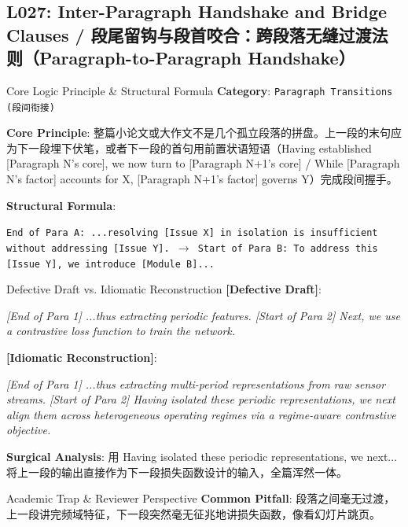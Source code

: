 \subsection{L027: Inter-Paragraph Handshake and Bridge Clauses / 段尾留钩与段首咬合：跨段落无缝过渡法则（Paragraph-to-Paragraph Handshake）}\label{sec:logic:L027}
\begin{ConceptBox}{Core Logic Principle \& Structural Formula}
\textbf{Category}: \texttt{Paragraph Transitions (段间衔接)}\par\vspace{3pt}
\textbf{Core Principle}: 整篇小论文或大作文不是几个孤立段落的拼盘。上一段的末句应为下一段埋下伏笔，或者下一段的首句用前置状语短语（Having established [Paragraph N's core], we now turn to [Paragraph N+1's core] / While [Paragraph N's factor] accounts for X, [Paragraph N+1's factor] governs Y）完成段间握手。\par\vspace{4pt}
\textbf{Structural Formula}:\par\noindent\texttt{End of Para A: ...resolving [Issue X] in isolation is insufficient without addressing [Issue Y]. $\to$ Start of Para B: To address this [Issue Y], we introduce [Module B]...}
\end{ConceptBox}
\begin{ExampleBox}{Defective Draft vs. Idiomatic Reconstruction}
\textbf{\color{TargetHighlight}[Defective Draft]}:\par\textit{[End of Para 1] ...thus extracting periodic features. [Start of Para 2] Next, we use a contrastive loss function to train the network.}\par\vspace{4pt}
\textbf{\color{AcadNavy}[Idiomatic Reconstruction]}:\par\textit{[End of Para 1] ...thus extracting multi-period representations from raw sensor streams. [Start of Para 2] Having isolated these periodic representations, we next align them across heterogeneous operating regimes via a regime-aware contrastive objective.}\par\vspace{4pt}
\textbf{Surgical Analysis}: 用 Having isolated these periodic representations, we next... 将上一段的输出直接作为下一段损失函数设计的输入，全篇浑然一体。
\end{ExampleBox}
\begin{TipBox}{Academic Trap \& Reviewer Perspective}
\textbf{Common Pitfall}: 段落之间毫无过渡，上一段讲完频域特征，下一段突然毫无征兆地讲损失函数，像看幻灯片跳页。
\end{TipBox}
\vspace{6pt}
